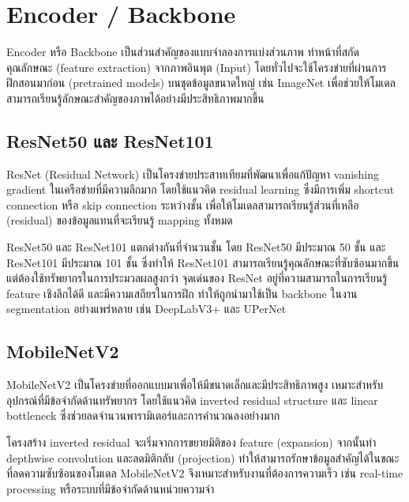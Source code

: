 \section{Encoder / Backbone}
Encoder หรือ Backbone เป็นส่วนสำคัญของแบบจำลองการแบ่งส่วนภาพ ทำหน้าที่สกัดคุณลักษณะ (feature extraction) จากภาพอินพุต (Input) โดยทั่วไปจะใช้โครงข่ายที่ผ่านการฝึกสอนมาก่อน (pretrained models) บนชุดข้อมูลขนาดใหญ่ เช่น ImageNet เพื่อช่วยให้โมเดลสามารถเรียนรู้ลักษณะสำคัญของภาพได้อย่างมีประสิทธิภาพมากขึ้น \cite{he2016resnet, sandler2018mobilenetv2, tan2019efficientnet}

\subsection{ResNet50 และ ResNet101}
ResNet (Residual Network) เป็นโครงข่ายประสาทเทียมที่พัฒนาเพื่อแก้ปัญหา vanishing gradient ในเครือข่ายที่มีความลึกมาก โดยใช้แนวคิด residual learning ซึ่งมีการเพิ่ม shortcut connection หรือ skip connection ระหว่างชั้น เพื่อให้โมเดลสามารถเรียนรู้ส่วนที่เหลือ (residual) ของข้อมูลแทนที่จะเรียนรู้ mapping ทั้งหมด \cite{he2016resnet}

ResNet50 และ ResNet101 แตกต่างกันที่จำนวนชั้น โดย ResNet50 มีประมาณ 50 ชั้น และ ResNet101 มีประมาณ 101 ชั้น ซึ่งทำให้ ResNet101 สามารถเรียนรู้คุณลักษณะที่ซับซ้อนมากขึ้น แต่ต้องใช้ทรัพยากรในการประมวลผลสูงกว่า
จุดเด่นของ ResNet อยู่ที่ความสามารถในการเรียนรู้ feature เชิงลึกได้ดี และมีความเสถียรในการฝึก ทำให้ถูกนำมาใช้เป็น backbone ในงาน segmentation อย่างแพร่หลาย เช่น DeepLabV3+ และ UPerNet

\subsection{MobileNetV2}
MobileNetV2 เป็นโครงข่ายที่ออกแบบมาเพื่อให้มีขนาดเล็กและมีประสิทธิภาพสูง เหมาะสำหรับอุปกรณ์ที่มีข้อจำกัดด้านทรัพยากร โดยใช้แนวคิด inverted residual structure และ linear bottleneck ซึ่งช่วยลดจำนวนพารามิเตอร์และการคำนวณลงอย่างมาก \cite{sandler2018mobilenetv2}

โครงสร้าง inverted residual จะเริ่มจากการขยายมิติของ feature (expansion) จากนั้นทำ depthwise convolution และลดมิติกลับ (projection) ทำให้สามารถรักษาข้อมูลสำคัญได้ในขณะที่ลดความซับซ้อนของโมเดล
MobileNetV2 จึงเหมาะสำหรับงานที่ต้องการความเร็ว เช่น real-time processing หรือระบบที่มีข้อจำกัดด้านหน่วยความจำ


